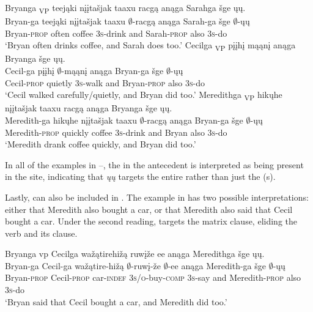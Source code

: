 \documentclass[output=paper]{LSP/langsci}
\begin{document}
\ea\label{ex:johnson:10}
\ea 
\glll Bryanga  {\ob}\textsubscript{VP} teejąki {nįįtašjak taaxu} racgą{\cb} anąga Sarahga šge {\ob}ųų{\cb}.\\ 
Bryan-ga {} teejąki {nįįtašjak taaxu} $\emptyset$-racgą anąga Sarah-ga šge $\emptyset$-ųų\\
Bryan-\textsc{prop} {} often coffee \textsc{3s}-drink and Sarah-\textsc{prop} also \textsc{3s}-do\\
\trans `Bryan often drinks coffee, and Sarah does too.'
\ex 
\glll Cecilga  {\ob}\textsubscript{VP} pįįhį mąąnį{\cb} anąga Bryanga šge {\ob}ųų{\cb}.\\
Cecil-ga {} pįįhį $\emptyset$-mąąnį anąga Bryan-ga šge $\emptyset$-ųų\\
Cecil-\textsc{prop} {} quietly \textsc{3s}-walk and Bryan-\textsc{prop} also \textsc{3s}-do\\
\trans `Cecil walked carefully/quietly, and Bryan did too.'
\ex 
\glll Meredithga {\ob}\textsubscript{VP} hikųhe {nįįtašjak taaxu} racgą{\cb} anąga Bryanga šge {\ob}ųų{\cb}.\\
Meredith-ga {} hikųhe {nįįtašjak taaxu} $\emptyset$-racgą anąga Bryan-ga šge $\emptyset$-ųų\\
Meredith-\textsc{prop} {} quickly coffee \textsc{3s}-drink and Bryan also \textsc{3s}-do\\
\trans `Meredith drank coffee quickly, and Bryan did too.'
\z
\z

In all of the examples in --, the  in the antecedent  is interpreted as being present in the  site, indicating that \emph{ųų} targets the entire  rather than just the (s).

Lastly,   can also be included in . The example in  has two possible interpretations: either that Meredith also bought a car, or that Meredith also said that Cecil bought a car. Under the second reading,  targets the matrix clause, eliding the verb and its  clause.
 
\ea\label{ex:johnson:11} 
\glll Bryanga {\ob}{vp} Cecilga wažątirehižą ruwįže ee{\cb} anąga Meredithga šge {\ob}ųų{\cb}.\\
Bryan-ga {} Cecil-ga wažątire-hižą $\emptyset$-ruwį-že $\emptyset$-ee anąga Meredith-ga šge $\emptyset$-ųų\\
Bryan-\textsc{prop} {} Cecil-\textsc{prop} car-\textsc{indef} \textsc{3s/o}-buy-\textsc{comp} \textsc{3s}-say and Meredith-\textsc{prop} also \textsc{3s}-do\\
\trans `Bryan said that Cecil bought a car, and Meredith did too.'
\z
\end{document}

